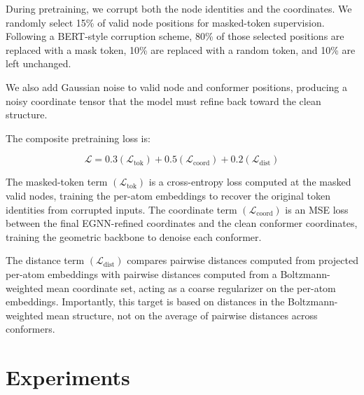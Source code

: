 \documentclass{article}
\begin{document}
During pretraining, we corrupt both the node identities and the coordinates. We randomly select 15\% of valid node positions for masked-token supervision. Following a BERT-style corruption scheme, 80\% of those selected positions are replaced with a mask token, 10\% are replaced with a random token, and 10\% are left unchanged. 

We also add Gaussian noise to valid node and conformer positions, producing a noisy coordinate tensor that the model must refine back toward the clean structure.

The composite pretraining loss is:


\begin{equation}
  \mathcal{L} = 0.3 (\mathcal{L}_{\mathrm{tok}})
              + 0.5 (\mathcal{L}_{\mathrm{coord}})
              + 0.2 (\mathcal{L}_{\mathrm{dist}})
\end{equation}


The masked-token term $(\mathcal{L}_{\mathrm{tok}})$ is a cross-entropy loss computed at the masked valid nodes, training the per-atom embeddings to recover the original token identities from corrupted inputs. The coordinate term $(\mathcal{L}_{\mathrm{coord}})$ is an MSE loss between the final EGNN-refined coordinates and the clean conformer coordinates, training the geometric backbone to denoise each conformer. 

The distance term $(\mathcal{L}_{\mathrm{dist}})$ compares pairwise distances computed from projected per-atom embeddings with pairwise distances computed from a Boltzmann-weighted mean coordinate set, acting as a coarse regularizer on the per-atom embeddings. Importantly, this target is based on distances in the Boltzmann-weighted mean structure, not on the average of pairwise distances across conformers.


\section{Experiments}
\label{sec:experiments}
\end{document}

